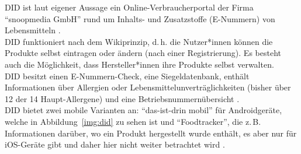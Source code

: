 \ac{DID} ist laut eigener Aussage ein Online-Verbraucherportal
der Firma "`snoopmedia GmbH"' rund um Inhalts- und Zusatzstoffe
(E-Nummern) von Lebensmitteln .\\
\ac{DID} funktioniert nach dem Wikiprinzip, d.\,h. die Nutzer*innen können
die Produkte selbst eintragen oder ändern
(nach einer Registrierung). Es besteht auch die Möglichkeit,
dass Hersteller*innen ihre Produkte selbst verwalten.\\
\ac{DID} besitzt einen E-Nummern-Check, eine Siegeldatenbank, enthält
Informationen über Allergien oder Lebensmittelunverträglichkeiten
(bisher über 12 der 14 Haupt-Allergene) und eine
Betriebsnummernübersicht .\\
\ac{DID} bietet zwei mobile Varianten an: "`das-ist-drin mobil"' für
Androidgeräte, welche in Abbildung~\ref{img:did} zu sehen ist
und "`Foodtracker"', die z.\,B. Informationen darüber,
wo ein Produkt hergestellt wurde enthält, es aber nur für iOS-Geräte gibt
und daher hier nicht weiter betrachtet wird .


